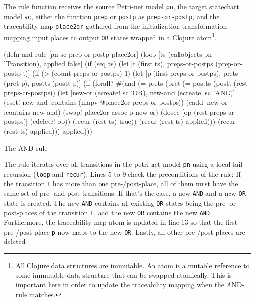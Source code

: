 \documentclass[submission]{eptcs}
\begin{document}
The rule function receives the source Petri-net model \verb|pn|, the target
statechart model \verb|sc|, either the function \verb|prep| or \verb|postp| as
\verb|prep-or-postp|, and the traceability map \verb|place2or| gathered from
the initialization transformation mapping input places to output \verb|OR|
states wrapped in a Clojure atom\footnote{All Clojure data structures are
  immutable.  An atom is a mutable reference to some immutable data structure
  that can be swapped atomically.  This is important here in order to update
  the traceability mapping when the AND-rule matches.}.

\begin{listing}[ht]
  \begin{clojurecode}
(defn and-rule [pn sc prep-or-postp place2or]
  (loop [ts (eallobjects pn 'Transition), applied false]
    (if (seq ts)
      (let [t (first ts), preps-or-postps (prep-or-postp t)]
        (if (> (count preps-or-postps) 1)
          (let [p (first preps-or-postps), prets (pret p), postts (postt p)]
            (if (forall? #(and (= prets  (pret %
                               (= postts (postt %
                         (rest preps-or-postps))
              (let [new-or  (ecreate! sc 'OR), new-and (ecreate! sc 'AND)]
                (eset! new-and :contains (mapv @place2or preps-or-postps))
                (eadd! new-or  :contains new-and)
                (swap! place2or assoc p new-or)
                (doseq [op (rest preps-or-postps)]
                  (edelete! op))
                (recur (rest ts) true))
              (recur (rest ts) applied)))
          (recur (rest ts) applied)))
      applied)))
  \end{clojurecode}
  \label{lst:and-rule}
  \caption{The AND rule}
\end{listing}

The rule iterates over all transitions in the petri-net model \verb|pn| using a
local tail-recursion (\verb|loop| and \verb|recur|).  Lines 5 to 9 check the
preconditions of the rule: If the transition \verb|t| has more than one
pre-/post-place, all of them must have the same set of pre- and
post-transitions.  If that's the case, a new \verb|AND| and a new \verb|OR|
state is created.  The new \verb|AND| contains all existing \verb|OR| states
being the pre- or post-places of the transition \verb|t|, and the new \verb|OR|
contains the new \verb|AND|.  Furthermore, the traceability map atom is updated
in line 13 so that the first pre-/post-place \verb|p| now maps to the new
\verb|OR|.  Lastly, all other pre-/post-places are deleted.
\end{document}
